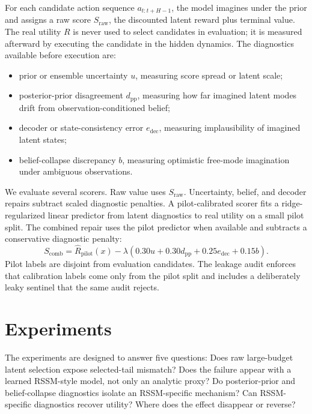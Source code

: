 \documentclass{article}
\newcommand{\rssm}{RSSM}
\begin{document}
For each candidate action sequence \(a_{t:t+H-1}\), the model imagines under the prior and assigns a raw score \(S_{\mathrm{raw}}\), the discounted latent reward plus terminal value. The real utility \(R\) is never used to select candidates in evaluation; it is measured afterward by executing the candidate in the hidden dynamics. The diagnostics available before execution are:
\begin{itemize}
  \item prior or ensemble uncertainty \(u\), measuring score spread or latent scale;
  \item posterior-prior disagreement \(d_{\mathrm{pp}}\), measuring how far imagined latent modes drift from observation-conditioned belief;
  \item decoder or state-consistency error \(e_{\mathrm{dec}}\), measuring implausibility of imagined latent states;
  \item belief-collapse discrepancy \(b\), measuring optimistic free-mode imagination under ambiguous observations.
\end{itemize}

We evaluate several scorers. Raw value uses \(S_{\mathrm{raw}}\). Uncertainty, belief, and decoder repairs subtract scaled diagnostic penalties. A pilot-calibrated scorer fits a ridge-regularized linear predictor from latent diagnostics to real utility on a small pilot split. The combined repair uses the pilot predictor when available and subtracts a conservative diagnostic penalty:
\begin{equation}
S_{\mathrm{comb}} =
\hat{R}_{\mathrm{pilot}}(x) -
\lambda(0.30u + 0.30d_{\mathrm{pp}} + 0.25e_{\mathrm{dec}} + 0.15b).
\end{equation}
Pilot labels are disjoint from evaluation candidates. The leakage audit enforces that calibration labels come only from the pilot split and includes a deliberately leaky sentinel that the same audit rejects.

\section{Experiments}

The experiments are designed to answer five questions: Does raw large-budget latent selection expose selected-tail mismatch? Does the failure appear with a learned \rssm-style model, not only an analytic proxy? Do posterior-prior and belief-collapse diagnostics isolate an RSSM-specific mechanism? Can \rssm-specific diagnostics recover utility? Where does the effect disappear or reverse?
\end{document}
